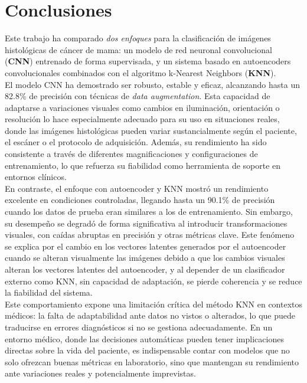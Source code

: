 \documentclass[12pt]{article} %
\begin{document}
\newpage
\section{Conclusiones}
Este trabajo ha comparado \textit{dos enfoques} para la clasificación de imágenes histológicas de cáncer de mama: un modelo de red neuronal convolucional (\textbf{CNN}) entrenado de forma supervisada, y un sistema basado en autoencoders convolucionales combinados con el algoritmo k-Nearest Neighbors (\textbf{KNN}).\\

El modelo CNN ha demostrado ser robusto, estable y eficaz, alcanzando hasta un 82.8\% de precisión con técnicas de \textit{data augmentation}. Esta capacidad de adaptarse a variaciones visuales como cambios en iluminación, orientación o resolución lo hace especialmente adecuado para su uso en situaciones reales, donde las imágenes histológicas pueden variar sustancialmente según el paciente, el escáner o el protocolo de adquisición. Además, su rendimiento ha sido consistente a través de diferentes magnificaciones y configuraciones de entrenamiento, lo que refuerza su fiabilidad como herramienta de soporte en entornos clínicos.\\

En contraste, el enfoque con autoencoder y KNN mostró un rendimiento excelente en condiciones controladas, llegando hasta un 90.1\% de precisión cuando los datos de prueba eran similares a los de entrenamiento. Sin embargo, su desempeño se degradó de forma significativa al introducir transformaciones visuales, con caídas abruptas en precisión y otras métricas clave. Este fenómeno se explica por el cambio en los vectores latentes generados por el autoencoder cuando se alteran visualmente las imágenes debido a que los cambios visuales alteran los vectores latentes del autoencoder, y al depender de un clasificador externo como KNN, sin capacidad de adaptación, se pierde coherencia y se reduce la fiabilidad del sistema.\\

Este comportamiento expone una limitación crítica del método KNN en contextos médicos: la falta de adaptabilidad ante datos no vistos o alterados, lo que puede traducirse en errores diagnósticos si no se gestiona adecuadamente. En un entorno médico, donde las decisiones automáticas pueden tener implicaciones directas sobre la vida del paciente, es indispensable contar con modelos que no solo ofrezcan buenas métricas en laboratorio, sino que mantengan su rendimiento ante variaciones reales y potencialmente imprevistas.\\
\end{document}
